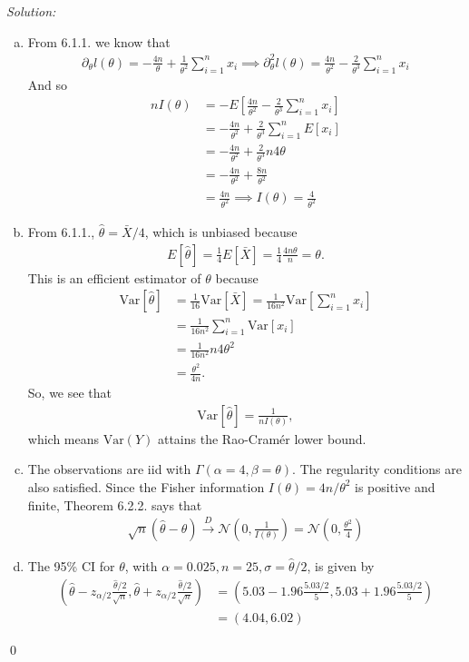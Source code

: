 \documentclass{book}
\theoremstyle{definition}
\newcommand{\p}{\partial}
\newcommand{\nn}{\nonumber}
\newcommand{\al}{\alpha}
\newcommand{\be}{\beta}
\newcommand{\Var}{\text{Var}}
\newcommand{\N}{\mathcal{N}}
\newcommand{\f}[2]{\frac{#1}{#2}}
\newcommand{\lp}{\left(}
\newcommand{\rp}{\right)}
\newcommand{\lb}{\left[}
\newcommand{\rb}{\right]}
\begin{document}
\noindent \textit{Solution:}


\begin{enumerate}[(a)]
	\item From 6.1.1. we know that 
	\begin{align}
	\p_\theta l(\theta) = -\f{4n}{\theta} + \f{1}{\theta^2}\sum^n_{i=1} x_i \implies \p^2_\theta l(\theta) = \f{4n}{\theta^2} - \f{2}{\theta^3}\sum^n_{i=1} x_i
	\end{align}
	And so 
	\begin{align}
	nI(\theta) 
	&= -E\lb\f{4n}{\theta^2} - \f{2}{\theta^3}\sum^n_{i=1} x_i \rb\nn\\ 
	&= -\f{4n}{\theta^2} + \f{2}{\theta^3}\sum^n_{i=1}E[x_i]\nn\\
	&= -\f{4n}{\theta^2} + \f{2}{\theta^3}n 4\theta\nn\\
	&= -\f{4n}{\theta^2} + \f{8n}{\theta^2}\nn\\
	&= \boxed{\f{4n}{\theta^2}}  \implies \boxed{I(\theta) = \f{4}{\theta^2}}
	\end{align}
	
	
	\item From 6.1.1., $\hat\theta = \bar{X}/4$, which is unbiased because 
	\begin{align}
	E[\hat\theta] = \f{1}{4}E[\bar{X}] = \f{1}{4}\f{4n\theta}{n} = \theta.
	\end{align}
	This is an efficient estimator of $\theta$ because 
	\begin{align}
	\Var[\hat\theta] &= \f{1}{16}\Var[\bar{X}] = \f{1}{16n^2}\Var\lb \sum^n_{i=1}x_i \rb\nn\\
	&= \f{1}{16n^2}\sum^n_{i=1}\Var[x_i]\nn\\
	&= \f{1}{16n^2}n4\theta^2 \nn\\
	&= \f{\theta^2}{4n}.
	\end{align}
	So, we see that 
	\begin{align}
	\Var[\hat\theta] = \f{1}{nI(\theta)},
	\end{align}
	which means $\Var(Y)$ attains the Rao-Cram\'er lower bound.
	
	
	\item The observations are iid with $\Gamma(\al=4,\be = \theta)$. The regularity conditions are also satisfied. Since the Fisher information $I(\theta) = 4n/\theta^2$ is positive and finite, Theorem 6.2.2. says that
	\begin{align}
	\sqrt{n}(\hat\theta - \theta) \xrightarrow{D} \N\lp 0, \f{1}{I(\theta)} \rp = \boxed{\N \lp 0, \f{\theta^2}{4} \rp}
	\end{align}
	
	
	
	\item The 95\% CI for $\theta$, with $\al = 0.025, n = 25, \sigma = \hat\theta/2$, is given by
	\begin{align}
	\lp \hat\theta - z_{\al/2}\f{\hat\theta/2}{\sqrt{n}}, \hat\theta + z_{\al/2}\f{\hat\theta/2}{\sqrt{n}} \rp &= \lp 5.03 - 1.96\f{5.03/2}{5}, 5.03 + 1.96\f{5.03/2}{5}  \rp \nn\\
	&=  \boxed{\lp 4.04, 6.02 \rp}
	\end{align}
	
	
	
	
\end{enumerate}\qed
\end{document}
